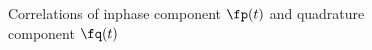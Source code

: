 \begin{figure}[ht]
\begin{center}
\begin{fsL}
\begin{tabular}{cccc}
\end{tabular}
\end{fsL}
\end{center}
\caption{
   Correlations of inphase component $\fp(t)$ and quadrature component $\fq(t)$
   \label{fig:Rpq}
   }
\end{figure}

